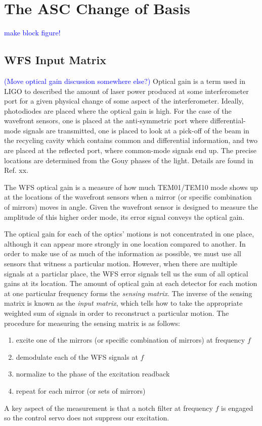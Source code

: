\section{The ASC Change of Basis}
\textcolor{blue}{make block figure!}



\subsection{WFS Input Matrix}
\textcolor{blue}{(Move optical gain discussion somewhere else?)}
Optical gain is a term used in LIGO to described the amount of laser
power produced at some interferometer port for a given physical change
of some aspect of the interferometer. Ideally, photodiodes are placed
where the optical gain is high. For the case of the wavefront sensors,
one is placed at the anti-symmetric port where differential-mode
signals are transmitted, one is placed to look at a pick-off of the
beam in the recycling cavity which contains common and differential
information, and two are placed at the reflected port, where
common-mode signals end up. The precise locations are determined from
the Gouy phases of the light. Details are found in Ref. xx.

The WFS optical gain is a measure of how much TEM01/TEM10 mode shows
up at the locations of the wavefront sensors when a mirror (or
specific combination of mirrors) moves in angle. Given the wavefront
sensor is designed to measure the amplitude of this higher order mode,
its error signal conveys the optical gain.

The optical gain for each of the optics' motions is not concentrated
in one place, although it can appear more strongly in one location
compared to another. In order to make use of as much of the
information as possible, we must use all sensors that witness a
particular motion. However, when there are multiple signals at a
particlar place, the WFS error signals tell us the sum of all optical
gains at its location. The amount of optical gain at each detector for
each motion at one particular frequency forms the \emph{sensing
  matrix}. The inverse of the sensing matrix is known as the
\emph{input matrix}, which tells how to take the appropriate weighted
sum of signals in order to reconstruct a particular motion. The
procedure for measuring the sensing matrix is as follows:
\begin{enumerate}
\item excite one of the mirrors (or specific combination of mirrors)
  at frequency $f$ \vspace{-10pt}
\item demodulate each of the WFS signals at $f$ \vspace{-10pt}
\item normalize to the phase of the excitation readback \vspace{-10pt}
\item repeat for each mirror (or sets of mirrors)
\end{enumerate}
A key aspect of the measurement is that a notch filter at frequency
$f$ is engaged so the control servo does not suppress our excitation.

